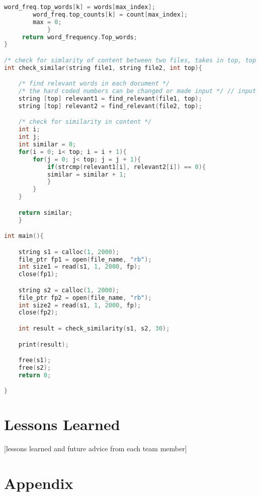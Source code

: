 \documentclass{article}
\begin{document}
\begin{lstlisting}[language=C]
		word_freq.top_words[k] = words[max_index];
		word_freq.top_counts[k] = count[max_index];
		max = 0;
	    	}
	 return word_frequency.Top_words;
}

/* check for simlarity of content between two files, takes in top, top i words are compared, returns number of common top words. */
int check_similar(string file1, string file2, int top){

	/* find relevant words in each document */
	/* the hard coded numbers can be changed or made input */ // input would be ideal
	string [top] relevant1 = find_relevant(file1, top); 
	string [top] relevant2 = find_relevant(file2, top);

	/* check for similarity in content */
	int i;
	int j;
	int similar = 0;
	for(i = 0; i< top; i = i + 1){
		for(j = 0; j< top; j = j + 1){
			if(strcmp(relevant1[i], relevant2[i]) == 0){				
			similar = similar + 1; 
			}
		}
	}

	return similar;
	}

int main(){

	string s1 = calloc(1, 2000);
	file_ptr fp1 = open(file_name, "rb");
	int size1 = read(s1, 1, 2000, fp);
	close(fp1);

	string s2 = calloc(1, 2000);
	file_ptr fp2 = open(file_name, "rb");
	int size2 = read(s1, 1, 2000, fp);
	close(fp2);

	int result = check_similarity(s1, s2, 30);

	print(result);

	free(s1);
	free(s2);
	return 0;

}
\end{lstlisting}


\newpage
\section{Lessons Learned}
[lessons learned and future advice from each team member]


\newpage
\section{Appendix}
\end{document}
